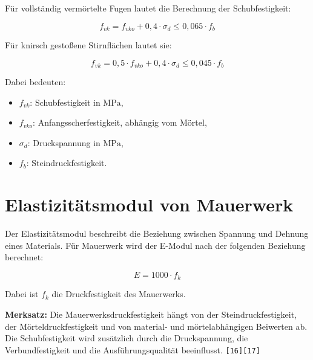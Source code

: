 \documentclass[
  12pt,
  a4paper,
  oneside
]{scrreprt}
\newcommand{\quelle}[1]{\hfill\texttt{#1}}
\begin{document}
Für vollständig vermörtelte Fugen lautet die Berechnung der
Schubfestigkeit:

\begin{equation}
  f_{vk} =
  f_{vko} + 0{,}4 \cdot \sigma_d
  \leq
  0{,}065 \cdot f_b
\end{equation}

Für knirsch gestoßene Stirnflächen lautet sie:

\begin{equation}
  f_{vk} =
  0{,}5 \cdot f_{vko} + 0{,}4 \cdot \sigma_d
  \leq
  0{,}045 \cdot f_b
\end{equation}

Dabei bedeuten:

\begin{itemize}
  \item \(f_{vk}\): Schubfestigkeit in \(\mathrm{MPa}\),
  \item \(f_{vko}\): Anfangsscherfestigkeit, abhängig vom Mörtel,
  \item \(\sigma_d\): Druckspannung in \(\mathrm{MPa}\),
  \item \(f_b\): Steindruckfestigkeit.
\end{itemize}



\section{Elastizitätsmodul von Mauerwerk}

Der Elastizitätsmodul beschreibt die Beziehung zwischen Spannung und
Dehnung eines Materials. Für Mauerwerk wird der E-Modul nach der
folgenden Beziehung berechnet:

\begin{equation}
  E =
  1000 \cdot f_k
\end{equation}

Dabei ist \(f_k\) die Druckfestigkeit des Mauerwerks.


\begin{merksatzbox}
\textbf{Merksatz:}
Die Mauerwerksdruckfestigkeit hängt von der Steindruckfestigkeit, der
Mörteldruckfestigkeit und von material- und mörtelabhängigen
Beiwerten ab. Die Schubfestigkeit wird zusätzlich durch die
Druckspannung, die Verbundfestigkeit und die Ausführungsqualität
beeinflusst.
\quelle{[16][17]}
\end{merksatzbox}
\end{document}
